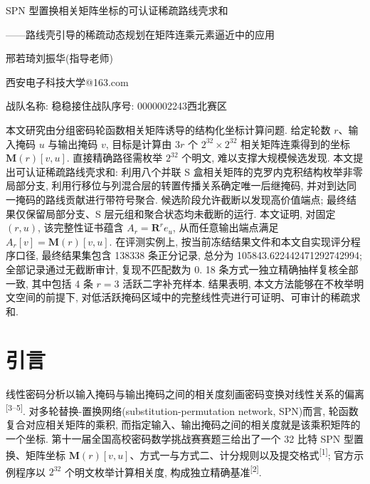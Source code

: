 \documentclass[UTF8,a4paper,zihao=-4,fontset=fandol]{ctexart}
\newcommand{\fangsongcustom}{\CJKfamily{fang}}
\numberwithin{equation}{section}
\theoremstyle{definition}
\theoremstyle{plain}
\theoremstyle{remark}
\begin{document}

\begin{center}
  {\heiti{} SPN 型置换相关矩阵坐标的可认证稀疏路线壳求和\par}
  \vspace{0.45em}
  {\heiti{} ——路线壳引导的稀疏动态规划在矩阵连乘元素逼近中的应用\par}
  \vspace{1.1em}
  {\fangsongcustom{} 邢若琦\quad 刘振华(指导老师)\par}
  \vspace{0.35em}
  {\songti{} 西安电子科技大学@163.com\par}
  \vspace{0.25em}
  {\songti{} 战队名称: 稳稳接住\quad 战队序号: 0000002243\quad 西北赛区\par}
\end{center}
\vspace{0.9em}

{\songti{}
本文研究由分组密码轮函数相关矩阵诱导的结构化坐标计算问题. 给定轮数 $r$、输入掩码 $u$ 与输出掩码 $v$, 目标是计算由 $3r$ 个 $2^{32}\times 2^{32}$ 相关矩阵连乘得到的坐标 $\bm{M}(r)[v,u]$. 直接精确路径需枚举 $2^{32}$ 个明文, 难以支撑大规模候选发现. 本文提出可认证稀疏路线壳求和: 利用八个并联 S 盒相关矩阵的克罗内克积结构枚举非零局部分支, 利用行移位与列混合层的转置传播关系确定唯一后继掩码, 并对到达同一掩码的路线贡献进行带符号聚合. 候选阶段允许截断以发现高价值端点; 最终结果仅保留局部分支、S 层元组和聚合状态均未截断的运行. 本文证明, 对固定 $(r,u)$, 该完整性证书蕴含 $A_r=\bm{R}^{r}e_u$, 从而任意输出端点满足 $A_r[v]=\bm{M}(r)[v,u]$. 在评测实例上, 按当前冻结结果文件和本文自实现评分程序口径, 最终结果集包含 138338 条正分记录, 总分为 105843.622442471292742994; 全部记录通过无截断审计, 复现不匹配数为 0. 18 条方式一独立精确抽样复核全部一致, 其中包括 4 条 $r=3$ 活跃二字补充样本. 结果表明, 本文方法能够在不枚举明文空间的前提下, 对低活跃掩码区域中的完整线性壳进行可证明、可审计的稀疏求和. }

\vspace{0.6em}

\section{引言}

线性密码分析以输入掩码与输出掩码之间的相关度刻画密码变换对线性关系的偏离\textsuperscript{[3--5]}. 对多轮替换-置换网络(substitution-permutation network, SPN)而言, 轮函数复合对应相关矩阵的乘积, 而指定输入、输出掩码之间的相关度就是该乘积矩阵的一个坐标. 第十一届全国高校密码数学挑战赛赛题三给出了一个 32 比特 SPN 型置换、矩阵坐标 $\bm{M}(r)[v,u]$、方式一与方式二、计分规则以及提交格式\textsuperscript{[1]}; 官方示例程序以 $2^{32}$ 个明文枚举计算相关度, 构成独立精确基准\textsuperscript{[2]}.
\end{document}
